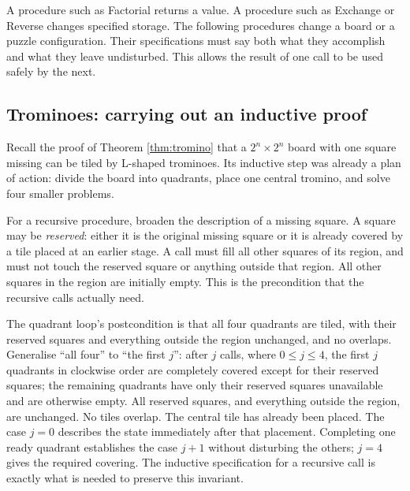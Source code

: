 A procedure such as Factorial returns a value. A procedure such as Exchange
or Reverse changes specified storage. The following procedures change a
board or a puzzle configuration. Their specifications must say both what
they accomplish and what they leave undisturbed. This allows the result
of one call to be used safely by the next.

\subsection{Trominoes: carrying out an inductive proof}

Recall the proof of Theorem \ref{thm:tromino} that a $2^n\times2^n$ board with one square missing can be
tiled by L-shaped trominoes. Its inductive step was already a plan of
action: divide the board into quadrants, place one central tromino, and
solve four smaller problems.

For a recursive procedure, broaden the description of a missing square.
A square may be \emph{reserved}: either it is the original missing square
or it is already covered by a tile placed at an earlier stage.
A call must fill all other squares of its region, and must not touch the
reserved square or anything outside that region. All other squares in
the region are initially empty. This is the precondition that the recursive
calls actually need.

The quadrant loop's postcondition is that all four quadrants are tiled,
with their reserved squares and everything outside the region unchanged,
and no overlaps. Generalise ``all four'' to ``the first $j$'': after
$j$ calls, where $0\leq j\leq4$, the first $j$ quadrants in clockwise order
are completely covered except for their reserved squares; the remaining
quadrants have only their reserved squares unavailable and are otherwise
empty. All reserved squares, and everything outside the region, are
unchanged. No tiles overlap. The central tile has already been placed.
The case $j=0$ describes the state immediately after that placement.
Completing one ready quadrant establishes the case $j+1$ without disturbing
the others; $j=4$ gives the required covering. The inductive specification
for a recursive call is exactly what is needed to preserve this invariant.

